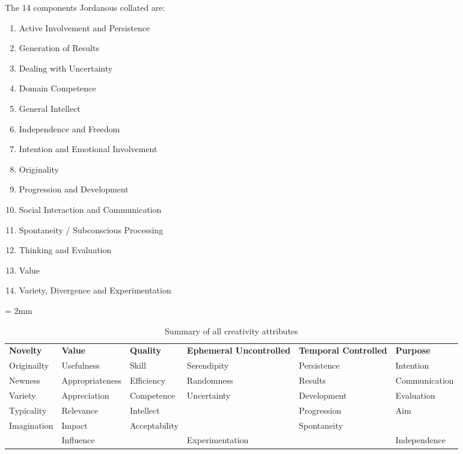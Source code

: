 The 14 components Jordanous collated are: \citep[p.118-120]{Jordanous2012}
\begin{enumerate}
  \item Active Involvement and Persistence
  \item Generation of Results
  \item Dealing with Uncertainty
  \item Domain Competence
  \item General Intellect
  \item Independence and Freedom
  \item Intention and Emotional Involvement
  \item Originality
  \item Progression and Development
  \item Social Interaction and Communication
  \item Spontaneity / Subconscious Processing
  \item Thinking and Evaluation
  \item Value
  \item Variety, Divergence and Experimentation
\end{enumerate}

\begin{table}[h]
  \everyrow{\hrule}
  \tabulinesep = 2mm
  \begin{tabu}{|X|X|X|X|X|X|}
  \textbf{Novelty}
  &
  \textbf{Value}
  &
  \textbf{Quality}
  &
  \textbf{Ephemeral Uncontrolled}
  &
  \textbf{Temporal Controlled}
  &
  \textbf{Purpose}
  \\
  Originailty
  &
  Usefulness
  &
  Skill
  &
  Serendipity
  &
  Persistence
  &
  Intention
  \\
  Newness
  &
  Appropriateness
  &
  Efficiency
  &
  Randomness
  &
  Results
  &
  Communication
  \\
  Variety
  &
  Appreciation
  &
  Competence
  &
  Uncertainty
  &
  Development
  &
  Evaluation
  \\
  Typicality
  &
  Relevance
  &
  Intellect
  &
  &
  Progression
  &
  Aim
  \\
  Imagination
  &
  Impact
  &
  Acceptability
  &
  &
  Spontaneity
  &
  \\
  &
  Influence
  &
  &
  Experimentation
  &
  &
  Independence
  \\
  \end{tabu}
\caption[Creativity attributes]{Summary of all creativity attributes}
\label{creatt}
\end{table}

